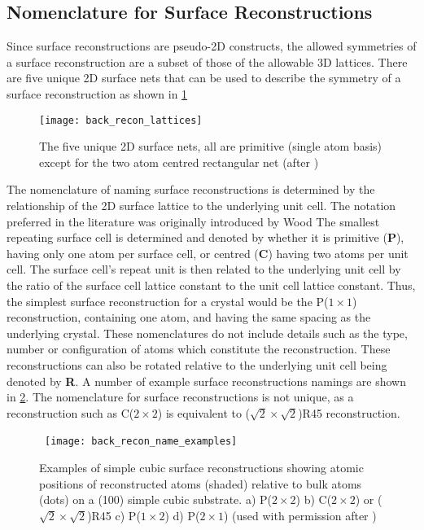 \subsection{Nomenclature for Surface Reconstructions} Since surface reconstructions are pseudo-2D constructs, the allowed symmetries of a surface reconstruction are a subset of those of the allowable 3D lattices.
There are five unique 2D surface nets that can be used to describe the symmetry of a surface reconstruction as shown in \cref{fig:back_recon_lattices}
\begin{figure}
 \centering \texttt{[image: back\_recon\_lattices]}
 \caption[2D Surface Nets]{\label{fig:back_recon_lattices}The five unique 2D surface nets, all are primitive (single atom basis) except for the two atom centred rectangular net (after \cite{ohring2001materials})}
\end{figure}

The nomenclature of naming surface reconstructions is determined by the relationship of the 2D surface lattice to the underlying unit cell.
The notation preferred in the literature was originally introduced by Wood\cite{Wood1964} The smallest repeating surface cell is determined and denoted by whether it is primitive (\textbf{P}), having only one atom per surface cell, or centred (\textbf{C}) having two atoms per unit cell.
The surface cell's repeat unit is then related to the underlying unit cell by the ratio of the surface cell lattice constant to the unit cell lattice constant.
Thus, the simplest surface reconstruction for a crystal would be the P(\(1 \times 1\)) reconstruction, containing one atom, and having the same spacing as the underlying crystal.
These nomenclatures do not include details such as the type, number or configuration of atoms which constitute the reconstruction.
These reconstructions can also be rotated relative to the underlying unit cell being denoted by \textbf{R}\@. A number of example surface reconstructions namings are shown in \cref{fig:back_recon_name_examples}.
The nomenclature for surface reconstructions is not unique, as a reconstruction such as C(\(2\times2\)) is equivalent to
(\(\sqrt{2}\times\sqrt{2}\))R45\degree{}
reconstruction.
\begin{figure}
 \centering\ \texttt{[image: back\_recon\_name\_examples]}
 \caption[Examples of surface reconstructions]{\label{fig:back_recon_name_examples}Examples of simple cubic surface reconstructions showing atomic positions of reconstructed atoms (shaded) relative to bulk atoms (dots) on a (100) simple cubic substrate.
  a) P(\(2 \times 2\)) b) C(\(2 \times 2\)) or
  (\(\sqrt{2}\times\sqrt{2}\))R45\degree{}
  c) P(\(1 \times 2\)) d) P(\(2 \times 1\)) (used with permission after \cite{ohring2001materials})}
\end{figure}


